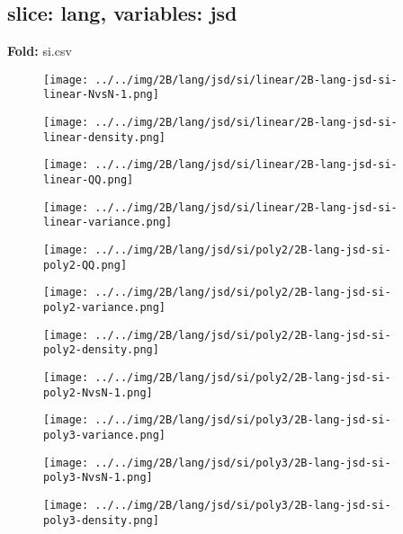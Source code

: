 \subsection{slice: lang, variables: jsd}
\textbf{Fold:} si.csv
\begin{figure}[H]
\centering	\texttt{[image: ../../img/2B/lang/jsd/si/linear/2B-lang-jsd-si-linear-NvsN-1.png]}
\end{figure}
\begin{figure}[H]
\centering	\texttt{[image: ../../img/2B/lang/jsd/si/linear/2B-lang-jsd-si-linear-density.png]}
\end{figure}
\begin{figure}[H]
\centering	\texttt{[image: ../../img/2B/lang/jsd/si/linear/2B-lang-jsd-si-linear-QQ.png]}
\end{figure}
\begin{figure}[H]
\centering	\texttt{[image: ../../img/2B/lang/jsd/si/linear/2B-lang-jsd-si-linear-variance.png]}
\end{figure}
\begin{figure}[H]
\centering	\texttt{[image: ../../img/2B/lang/jsd/si/poly2/2B-lang-jsd-si-poly2-QQ.png]}
\end{figure}
\begin{figure}[H]
\centering	\texttt{[image: ../../img/2B/lang/jsd/si/poly2/2B-lang-jsd-si-poly2-variance.png]}
\end{figure}
\begin{figure}[H]
\centering	\texttt{[image: ../../img/2B/lang/jsd/si/poly2/2B-lang-jsd-si-poly2-density.png]}
\end{figure}
\begin{figure}[H]
\centering	\texttt{[image: ../../img/2B/lang/jsd/si/poly2/2B-lang-jsd-si-poly2-NvsN-1.png]}
\end{figure}
\begin{figure}[H]
\centering	\texttt{[image: ../../img/2B/lang/jsd/si/poly3/2B-lang-jsd-si-poly3-variance.png]}
\end{figure}
\begin{figure}[H]
\centering	\texttt{[image: ../../img/2B/lang/jsd/si/poly3/2B-lang-jsd-si-poly3-NvsN-1.png]}
\end{figure}
\begin{figure}[H]
\centering	\texttt{[image: ../../img/2B/lang/jsd/si/poly3/2B-lang-jsd-si-poly3-density.png]}
\end{figure}
